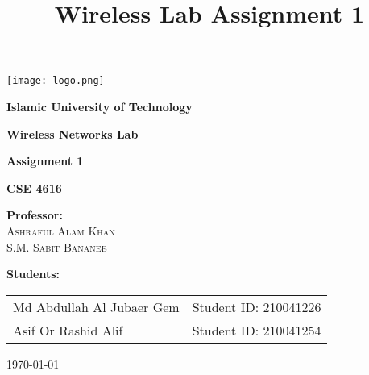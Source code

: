 \documentclass{article}
\title{Wireless Lab Assignment 1} %
\begin{document}


\begin{center}

    \texttt{[image: logo.png]} %

    \vspace{0.5cm}

    

    {\LARGE \textbf{Islamic University of Technology}} \\

    \vspace{0.3cm}

    {\Large \textbf{Wireless Networks Lab}} \\

    \vspace{0.3cm}

    {\large \textbf{Assignment 1}} \\

    \vspace{0.3cm}

    {\large \textbf{CSE 4616}} \\

    \vspace{1cm}

    

    \textbf{Professor:} \\

    \textsc{Ashraful Alam Khan} \\

    \textsc{S.M. Sabit Bananee} \\

    \vspace{1cm}

    

    \textbf{Students:} \\

    \begin{tabular}{ll}

        Md Abdullah Al Jubaer Gem & Student ID: 210041226 \\

        Asif Or Rashid Alif & Student ID: 210041254 \\

    

    \end{tabular}

    \vspace{1cm}

    

    \today

\end{center}
\end{document}
